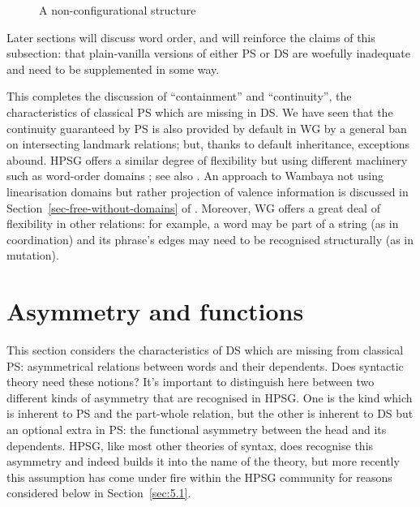 \documentclass[output=paper,biblatex,babelshorthands,newtxmath,draftmode,colorlinks,citecolor=brown]{langscibook}
\begin{document}
\begin{figure}
	\caption{A non-configurational structure}
	\label{fig:13}
\end{figure}

Later sections will discuss word order, and will reinforce the claims of this subsection: that
plain-vanilla versions of either PS or DS are woefully inadequate and need to be supplemented in
some way.

This completes the discussion of ``containment'' and ``continuity'', the characteristics of
classical PS which are missing in DS. We have seen that the continuity guaranteed by PS is also
provided by default in WG by a general ban on intersecting landmark relations; but, thanks to
default inheritance, exceptions abound. HPSG offers a similar degree of flexibility but using
different machinery such as word-order domains \citep{Reape94a}; see also
. An approach to Wambaya not using linearisation domains but rather
projection of valence information is discussed in Section~\ref{sec-free-without-domains} of . Moreover, WG offers a great deal of flexibility in other relations: for
example, a word may be part of a string (as in coordination) and its phrase's edges may need to be
recognised structurally (as in  mutation).


\section{Asymmetry and functions}
\label{sec:5}

This section considers the characteristics of DS which are missing from classical PS: asymmetrical relations between words and their dependents. Does syntactic theory need these notions? It's important to distinguish here between two different kinds of asymmetry that are recognised in HPSG. One is the kind which is inherent to PS and the part-whole relation, but the other is inherent to DS but an optional extra in PS: the functional asymmetry between the head and its dependents. HPSG, like most other theories of syntax, does recognise this asymmetry and indeed builds it into the name of the theory, but more recently this assumption has come under fire within the HPSG community for reasons considered below in Section~\ref{sec:5.1}.
\end{document}
